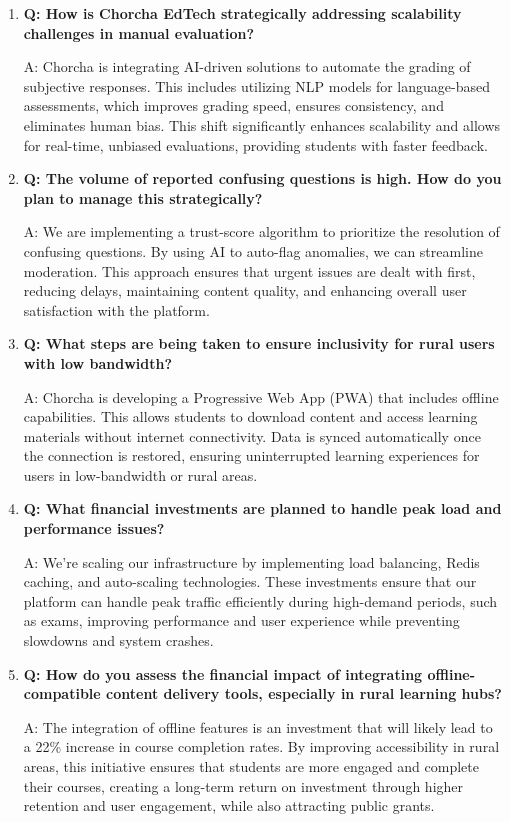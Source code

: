 \documentclass[12pt,a4paper,oneside]{book}
\begin{document}
\begin{enumerate}
\item \textbf{Q: How is Chorcha EdTech strategically addressing scalability challenges in manual evaluation?} 

A: Chorcha is integrating AI-driven solutions to automate the grading of subjective responses. This includes utilizing NLP models for language-based assessments, which improves grading speed, ensures consistency, and eliminates human bias. This shift significantly enhances scalability and allows for real-time, unbiased evaluations, providing students with faster feedback.

\item \textbf{Q: The volume of reported confusing questions is high. How do you plan to manage this strategically?} 

A: We are implementing a trust-score algorithm to prioritize the resolution of confusing questions. By using AI to auto-flag anomalies, we can streamline moderation. This approach ensures that urgent issues are dealt with first, reducing delays, maintaining content quality, and enhancing overall user satisfaction with the platform.

\item \textbf{Q: What steps are being taken to ensure inclusivity for rural users with low bandwidth?} 

A: Chorcha is developing a Progressive Web App (PWA) that includes offline capabilities. This allows students to download content and access learning materials without internet connectivity. Data is synced automatically once the connection is restored, ensuring uninterrupted learning experiences for users in low-bandwidth or rural areas.

\item \textbf{Q: What financial investments are planned to handle peak load and performance issues?} 

A: We’re scaling our infrastructure by implementing load balancing, Redis caching, and auto-scaling technologies. These investments ensure that our platform can handle peak traffic efficiently during high-demand periods, such as exams, improving performance and user experience while preventing slowdowns and system crashes.

\item \textbf{Q: How do you assess the financial impact of integrating offline-compatible content delivery tools, especially in rural learning hubs?} 

A: The integration of offline features is an investment that will likely lead to a 22\% increase in course completion rates. By improving accessibility in rural areas, this initiative ensures that students are more engaged and complete their courses, creating a long-term return on investment through higher retention and user engagement, while also attracting public grants.



\end{enumerate}
\end{document}
